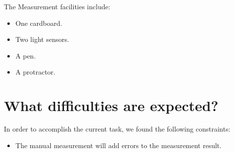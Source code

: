\documentclass[10pt]{scrartcl}
\begin{document}
The Measurement facilities include:

\begin{itemize}
	\item One cardboard.
	\item Two light sensors.
	\item A pen.
	\item A protractor.
\end{itemize}

\section*{What difficulties are expected?}

In order to accomplish the current task, we found the following constraints:

\begin{itemize}
	\item The manual measurement will add errors to the measurement result.
\end{itemize}
	
\end{document}
